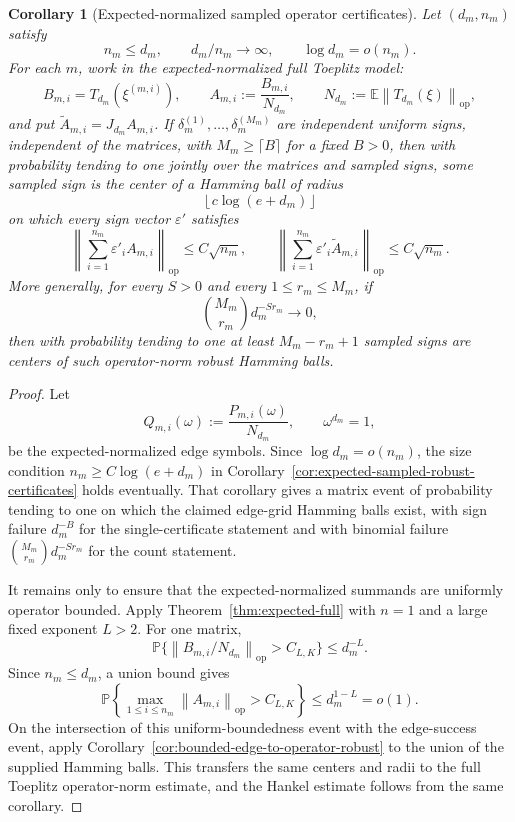 \documentclass[11pt]{amsart}
\numberwithin{equation}{section}
\newtheorem{corollary}[theorem]{Corollary}
\theoremstyle{definition}
\theoremstyle{remark}
\newcommand{\op}{\mathrm{op}}
\newcommand{\Prob}{\mathbb P}
\newcommand{\Exp}{\mathbb E}
\newcommand{\norm}[1]{\left\lVert #1\right\rVert}
\newcommand{\eps}{\varepsilon}
\begin{document}
\begin{corollary}[Expected-normalized sampled operator certificates]
\label{cor:expected-sampled-operator-certificates}
Let \((d_m,n_m)\) satisfy
\[
  n_m\le d_m,\qquad d_m/n_m\to\infty,\qquad \log d_m=o(n_m).
\]
For each \(m\), work in the expected-normalized full Toeplitz model:
\[
  B_{m,i}=T_{d_m}(\xi^{(m,i)}),\qquad
  A_{m,i}:=\frac{B_{m,i}}{N_{d_m}},
  \qquad
  N_{d_m}:=\Exp\norm{T_{d_m}(\xi)}_{\op},
\]
and put \(\widetilde A_{m,i}=J_{d_m}A_{m,i}\).  If
\(\delta_m^{(1)},\ldots,\delta_m^{(M_m)}\) are independent uniform signs,
independent of the matrices, with \(M_m\ge\lceil B\rceil\) for a fixed
\(B>0\), then with probability tending to one jointly over the matrices and
sampled signs, some sampled sign is the center of a Hamming ball of radius
\[
  \left\lfloor c\log(e+d_m)\right\rfloor
\]
on which every sign vector \(\eps'\) satisfies
\[
  \left\|\sum_{i=1}^{n_m}\eps'_iA_{m,i}\right\|_{\op}
  \le C\sqrt{n_m},
  \qquad
  \left\|\sum_{i=1}^{n_m}\eps'_i\widetilde A_{m,i}\right\|_{\op}
  \le C\sqrt{n_m}.
\]
More generally, for every \(S>0\) and every \(1\le r_m\le M_m\), if
\[
  \binom{M_m}{r_m}d_m^{-S r_m}\to0,
\]
then with probability tending to one at least \(M_m-r_m+1\) sampled signs are
centers of such operator-norm robust Hamming balls.
\end{corollary}

\begin{proof}
Let
\[
  Q_{m,i}(\omega):=\frac{P_{m,i}(\omega)}{N_{d_m}},
  \qquad \omega^{d_m}=1,
\]
be the expected-normalized edge symbols.  Since \(\log d_m=o(n_m)\), the size
condition \(n_m\ge C\log(e+d_m)\) in
Corollary~\ref{cor:expected-sampled-robust-certificates} holds eventually.
That corollary gives a matrix event of probability tending to one on which the
claimed edge-grid Hamming balls exist, with sign failure \(d_m^{-B}\) for the
single-certificate statement and with binomial failure
\(\binom{M_m}{r_m}d_m^{-S r_m}\) for the count statement.

It remains only to ensure that the expected-normalized summands are uniformly
operator bounded.  Apply Theorem~\ref{thm:expected-full} with \(n=1\) and a
large fixed exponent \(L>2\).  For one matrix,
\[
  \Prob\{\norm{B_{m,i}/N_{d_m}}_{\op}>C_{L,K}\}\le d_m^{-L}.
\]
Since \(n_m\le d_m\), a union bound gives
\[
  \Prob\left\{\max_{1\le i\le n_m}\norm{A_{m,i}}_{\op}>C_{L,K}\right\}
  \le d_m^{1-L}=o(1).
\]
On the intersection of this uniform-boundedness event with the edge-success
event, apply Corollary~\ref{cor:bounded-edge-to-operator-robust} to the union of
the supplied Hamming balls.  This transfers the same centers and radii to the
full Toeplitz operator-norm estimate, and the Hankel estimate follows from the
same corollary.
\end{proof}
\end{document}
